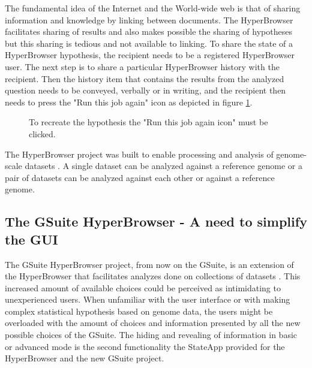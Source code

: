 \documentclass[english]{ifimaster}
\begin{document}
The fundamental idea of the Internet and the World-wide web is that of sharing information and knowledge by linking between documents. The HyperBrowser facilitates sharing of results and also makes possible the sharing of hypotheses but this sharing is tedious and not available to linking. To share the state of a HyperBrowser hypothesis, the recipient needs to be a registered HyperBrowser user. The next step is to share a particular HyperBrowser history with the recipient. Then the history item that contains the results from the analyzed question needs to be conveyed, verbally or in writing, and the recipient then needs to press the "Run this job again" icon as depicted in figure \ref{fig:runAgain}. 

\begin{figure}
\centering
{}
\caption{To recreate the hypothesis the "Run this job again icon" must be clicked.}
\label{fig:runAgain}
\end{figure}

The HyperBrowser project was built to enable processing and analysis of genome-scale datasets \parencite{sandve2013genomic}. A single dataset can be analyzed against a reference genome or a pair of datasets can be analyzed against each other or against a reference genome.


\subsection{The GSuite HyperBrowser - A need to simplify the GUI}
The GSuite HyperBrowser project, from now on the GSuite, is an extension of the HyperBrowser that facilitates analyzes done on collections of datasets \parencite{gsuite}. This increased amount of available choices could be perceived as intimidating to unexperienced users. When unfamiliar with the user interface or with making complex statistical hypothesis based on genome data, the users might be overloaded with the amount of choices and information presented by all the new possible choices of the GSuite. The hiding and revealing of information in basic or advanced mode is the second functionality the StateApp provided for the HyperBrowser and the new GSuite project.
\end{document}
